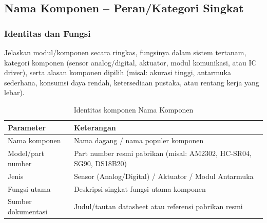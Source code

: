 
\subsection{Nama Komponen -- Peran/Kategori Singkat}
\label{subsec:nama_komponen}

\subsubsection{Identitas dan Fungsi}
Jelaskan modul/komponen secara ringkas, fungsinya dalam sistem tertanam,
kategori komponen (sensor analog/digital, aktuator, modul komunikasi, atau IC driver),
serta alasan komponen dipilih (misal: akurasi tinggi, antarmuka sederhana, konsumsi daya rendah,
ketersediaan pustaka, atau rentang kerja yang lebar).

\begin{table}[H]
	\centering
	\caption{Identitas komponen Nama Komponen}
	\label{tab:nama_komponen_identitas}
	\small
	\begin{tabularx}{\textwidth}{@{}lX@{}}
		\toprule
		Parameter          & Keterangan                                                       \\
		\midrule
		Nama komponen      & Nama dagang / nama populer komponen                              \\
		Model/part number  & Part number resmi pabrikan (misal: AM2302, HC-SR04, SG90, DS18B20) \\
		Jenis              & Sensor (Analog/Digital) / Aktuator / Modul Antarmuka             \\
		Fungsi utama       & Deskripsi singkat fungsi utama komponen                          \\
		Sumber dokumentasi & Judul/tautan datasheet atau referensi pabrikan resmi             \\
		\bottomrule
	\end{tabularx}
\end{table}


